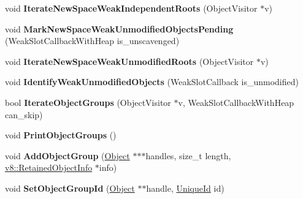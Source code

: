 \begin{DoxyCompactItemize}
\item 
void {\bfseries Iterate\+New\+Space\+Weak\+Independent\+Roots} (Object\+Visitor $\ast$v)\hypertarget{classv8_1_1internal_1_1_global_handles_a2adb59e8962c02691b071d772a3f7b74}{}\label{classv8_1_1internal_1_1_global_handles_a2adb59e8962c02691b071d772a3f7b74}

\item 
void {\bfseries Mark\+New\+Space\+Weak\+Unmodified\+Objects\+Pending} (Weak\+Slot\+Callback\+With\+Heap is\+\_\+unscavenged)\hypertarget{classv8_1_1internal_1_1_global_handles_a1f6cd01af0f32902a936fe5bd4599691}{}\label{classv8_1_1internal_1_1_global_handles_a1f6cd01af0f32902a936fe5bd4599691}

\item 
void {\bfseries Iterate\+New\+Space\+Weak\+Unmodified\+Roots} (Object\+Visitor $\ast$v)\hypertarget{classv8_1_1internal_1_1_global_handles_aca79cf6c228b2b8e708a13c4995b1e81}{}\label{classv8_1_1internal_1_1_global_handles_aca79cf6c228b2b8e708a13c4995b1e81}

\item 
void {\bfseries Identify\+Weak\+Unmodified\+Objects} (Weak\+Slot\+Callback is\+\_\+unmodified)\hypertarget{classv8_1_1internal_1_1_global_handles_a3af4aba6d067411dac31c436a3a71431}{}\label{classv8_1_1internal_1_1_global_handles_a3af4aba6d067411dac31c436a3a71431}

\item 
bool {\bfseries Iterate\+Object\+Groups} (Object\+Visitor $\ast$v, Weak\+Slot\+Callback\+With\+Heap can\+\_\+skip)\hypertarget{classv8_1_1internal_1_1_global_handles_a1d1e6e11c5dd6515d8d103856e36fb56}{}\label{classv8_1_1internal_1_1_global_handles_a1d1e6e11c5dd6515d8d103856e36fb56}

\item 
void {\bfseries Print\+Object\+Groups} ()\hypertarget{classv8_1_1internal_1_1_global_handles_a070f7ff2f9eb3740ec0c3612f86fb7a9}{}\label{classv8_1_1internal_1_1_global_handles_a070f7ff2f9eb3740ec0c3612f86fb7a9}

\item 
void {\bfseries Add\+Object\+Group} (\hyperlink{classv8_1_1internal_1_1_object}{Object} $\ast$$\ast$$\ast$handles, size\+\_\+t length, \hyperlink{classv8_1_1_retained_object_info}{v8\+::\+Retained\+Object\+Info} $\ast$info)\hypertarget{classv8_1_1internal_1_1_global_handles_a654887a9111563fa2c03c27516ee0526}{}\label{classv8_1_1internal_1_1_global_handles_a654887a9111563fa2c03c27516ee0526}

\item 
void {\bfseries Set\+Object\+Group\+Id} (\hyperlink{classv8_1_1internal_1_1_object}{Object} $\ast$$\ast$handle, \hyperlink{classv8_1_1_unique_id}{Unique\+Id} id)\hypertarget{classv8_1_1internal_1_1_global_handles_acb1f05dff3d4cc6b668b4c159b7bf90d}{}\label{classv8_1_1internal_1_1_global_handles_acb1f05dff3d4cc6b668b4c159b7bf90d}


\end{DoxyCompactItemize}
